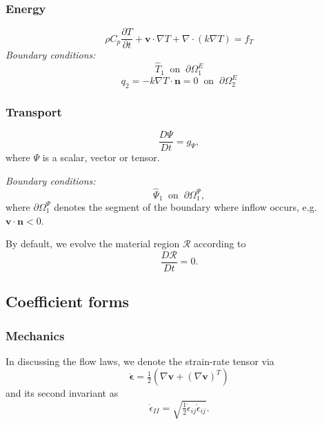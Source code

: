 \documentclass[paper=a4, fontsize=10pt,twoside]{scrartcl}
\begin{document}
\subsubsection*{Energy}
$$
	\rho C_p \frac{\partial T}{\partial t} + \boldsymbol v \cdot \nabla T + \nabla \cdot \left( k \nabla T\right) =  f_T
$$
\textit{Boundary conditions:}
$$
	\hat{T}_1 \medspace \text{ on } \medspace \partial \Omega^E_1
$$
$$
	q_2 = - k \nabla T \cdot \boldsymbol n = 0 \medspace \text{ on } \medspace \partial \Omega^E_2
$$

\subsubsection*{Transport}
$$
	\frac{D \Psi}{D t}  =  g_{\Psi},
$$
where $\Psi$ is a scalar, vector or tensor.

\textit{Boundary conditions:}
$$
	\hat{\Psi}_1 \medspace \text{ on } \medspace \partial \Omega^{\Psi}_1,
$$
where $\partial \Omega^{\Psi}_1$ denotes the segment of the boundary where inflow occurs, e.g. $\boldsymbol v \cdot \boldsymbol n < 0$.

By default, we evolve the material region $\mathcal R$ according to
$$
	\frac{D \mathcal R}{Dt} = 0.
$$

\subsection{Coefficient forms}

\subsubsection*{Mechanics}

In discussing the flow laws, we denote the strain-rate tensor via
$$
	\dot{\boldsymbol \epsilon} = \tfrac{1}{2} \left( \nabla \boldsymbol v + (\nabla \boldsymbol v)^T \right)
$$
and its second invariant as
$$
	\dot{\epsilon}_{II} = \sqrt{ \tfrac{1}{2} \dot{\epsilon}_{ij} \dot{\epsilon}_{ij} }.
$$
\end{document}
